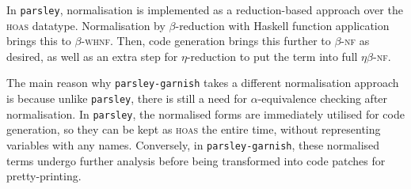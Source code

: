 \documentclass[../../../main.tex]{subfiles}
\begin{document}
In \texttt{parsley}, normalisation is implemented as a reduction-based approach over the \textsc{hoas}  datatype.
Normalisation by $\beta$-reduction with Haskell function application brings this to $\beta$-\textsc{whnf}.
Then, code generation brings this further to $\beta$-\textsc{nf} as desired, as well as an extra step for $\eta$-reduction to put the term into full $\eta\beta$-\textsc{nf}.

The main reason why \texttt{parsley-garnish} takes a different normalisation approach is because unlike \texttt{parsley}, there is still a need for $\alpha$-equivalence checking after normalisation.
In \texttt{parsley}, the normalised forms are immediately utilised for code generation, so they can be kept as \textsc{hoas} the entire time, without representing variables with any names.
Conversely, in \texttt{parsley-garnish}, these normalised terms undergo further analysis before being transformed into code patches for pretty-printing.


\end{document}

